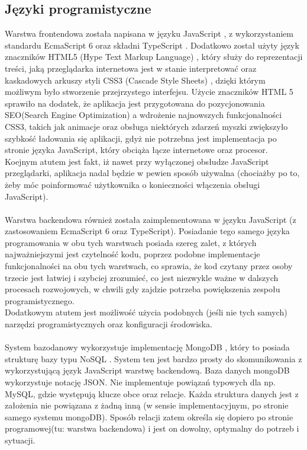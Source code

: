 \documentclass[eng,printmode]{mgr}
\begin{document}
\subsection{Języki programistyczne}
Warstwa frontendowa została napisana w języku JavaScript \cite {JS}, z wykorzystaniem standardu EcmaScript 6 \cite {ES6} oraz składni TypeScript \cite {TS}. Dodatkowo został użyty język znaczników HTML5 (Hype Text Markup Language) \cite {HTML}, który służy do reprezentacji treści, jaką przeglądarka internetowa jest w stanie interpretować oraz kaskadowych arkuszy styli CSS3 (Cascade Style Sheets) \cite {CSS}, dzięki którym możliwym było stworzenie przejrzystego interfejsu. Użycie znaczników HTML 5 sprawiło na dodatek, że aplikacja jest przygotowana do pozycjonowania SEO(Search Engine Optimization) \cite {HTML_SEO} a wdrożenie najnowszych funkcjonalności CSS3, takich jak animacje oraz obsługa niektórych zdarzeń myszki zwiększyło szybkość ładowania się aplikacji, gdyż nie potrzebna jest implementacja po stronie języka JavaScript, który obciąża łącze internetowe oraz procesor. Koejnym atutem jest fakt, iż nawet przy wyłączonej obsłudze JavaScript przeglądarki, aplikacja nadal będzie w pewien sposób używalna (chociażby po to, żeby móc poinformować użytkownika o konieczności włączenia obsługi JavaScript).
\\
\\
Warstwa backendowa również została zaimplementowana w języku JavaScript (z zastosowaniem EcmaScript 6 oraz TypeScript). Posiadanie tego samego języka programowania w obu tych warstwach posiada szereg zalet, z których najważniejszymi jest czytelność kodu, poprzez podobne implementacje funkcjonalności na obu tych warstwach, co sprawia, że kod czytany przez osoby trzecie jest łatwiej i szybciej zrozumieć, co jest niezwykle ważne w dalszych procesach rozwojowych, w chwili gdy zajdzie potrzeba powiększenia zespołu programistycznego.
\\
Dodatkowym atutem jest możliwość użycia podobnych (jeśli nie tych samych) narzędzi programistycznych oraz konfiguracji środowiska.
\\
\\
System bazodanowy wykorzystuje implementację MongoDB \cite{MongoDB}, który to posiada strukturę bazy typu NoSQL \cite{NO_SQL}. System ten jest bardzo prosty do skomunikowania z wykorzystującą język JavaScript warstwę backendową. Baza danych mongoDB wykorzystuje notację JSON. Nie implementuje powiązań typowych dla np. MySQL, gdzie występują klucze obce oraz relacje. Każda struktura danych jest z założenia nie powiązana z żadną inną (w sensie implementacyjnym, po stronie samego systemu mongoDB). Sposób relacji zatem określa się dopiero po stronie programowej(tu: warstwa backendowa) i jest on dowolny, optymalny do potrzeb i sytuacji.
\end{document}
